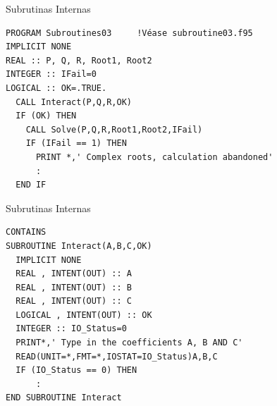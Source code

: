 \begin{frame}[fragile]{Subrutinas Internas}
 \begin{itemize}[<+(0)->]
      \begin{verbatim}
PROGRAM Subroutines03     !Véase subroutine03.f95
IMPLICIT NONE
REAL :: P, Q, R, Root1, Root2
INTEGER :: IFail=0
LOGICAL :: OK=.TRUE.
  CALL Interact(P,Q,R,OK)
  IF (OK) THEN
    CALL Solve(P,Q,R,Root1,Root2,IFail)
    IF (IFail == 1) THEN
      PRINT *,' Complex roots, calculation abandoned'
      :
  END IF    
      \end{verbatim}
 \end{itemize}
\end{frame}

\begin{frame}[fragile]{Subrutinas Internas}
 \begin{itemize}[<+(0)->]
    \begin{verbatim}
CONTAINS
SUBROUTINE Interact(A,B,C,OK)
  IMPLICIT NONE
  REAL , INTENT(OUT) :: A
  REAL , INTENT(OUT) :: B
  REAL , INTENT(OUT) :: C
  LOGICAL , INTENT(OUT) :: OK
  INTEGER :: IO_Status=0
  PRINT*,' Type in the coefficients A, B AND C'
  READ(UNIT=*,FMT=*,IOSTAT=IO_Status)A,B,C
  IF (IO_Status == 0) THEN
      :
END SUBROUTINE Interact
    \end{verbatim}
 \end{itemize}
\end{frame}